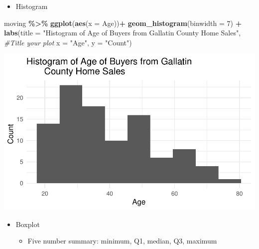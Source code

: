\documentclass[
]{report}
\newenvironment{Shaded}{\begin{snugshade}}{\end{snugshade}}
\newcommand{\AttributeTok}[1]{\textcolor[rgb]{0.13,0.29,0.53}{#1}}
\newcommand{\CommentTok}[1]{\textcolor[rgb]{0.56,0.35,0.01}{\textit{#1}}}
\newcommand{\DecValTok}[1]{\textcolor[rgb]{0.00,0.00,0.81}{#1}}
\newcommand{\FunctionTok}[1]{\textcolor[rgb]{0.13,0.29,0.53}{\textbf{#1}}}
\newcommand{\NormalTok}[1]{#1}
\newcommand{\SpecialCharTok}[1]{\textcolor[rgb]{0.81,0.36,0.00}{\textbf{#1}}}
\newcommand{\StringTok}[1]{\textcolor[rgb]{0.31,0.60,0.02}{#1}}
\providecommand{\tightlist}{%
  \setlength{\itemsep}{0pt}\setlength{\parskip}{0pt}}
\begin{document}
\newpage

\begin{itemize}
\tightlist
\item
  Histogram
\end{itemize}

\vspace{0.2in}

\begin{Shaded}
\begin{Highlighting}[]
\NormalTok{moving }\SpecialCharTok{\%\textgreater{}\%}
  \FunctionTok{ggplot}\NormalTok{(}\FunctionTok{aes}\NormalTok{(}\AttributeTok{x =}\NormalTok{ Age))}\SpecialCharTok{+}
  \FunctionTok{geom\_histogram}\NormalTok{(}\AttributeTok{binwidth =} \DecValTok{7}\NormalTok{) }\SpecialCharTok{+} 
  \FunctionTok{labs}\NormalTok{(}\AttributeTok{title =} \StringTok{"Histogram of Age of Buyers from Gallatin }
\StringTok{       County Home Sales"}\NormalTok{,}
       \CommentTok{\#Title your plot}
       \AttributeTok{x =} \StringTok{"Age"}\NormalTok{,}
       \AttributeTok{y =} \StringTok{"Count"}\NormalTok{)}
\end{Highlighting}
\end{Shaded}

\begin{center}\includegraphics[width=0.7\linewidth]{03-LN03-EDA_files/figure-latex/unnamed-chunk-16-1} \end{center}

\newpage

\begin{itemize}
\item
  Boxplot

  \begin{itemize}
  \tightlist
  \item
    Five number summary: minimum, Q1, median, Q3, maximum
  \end{itemize}
\end{itemize}

\vspace{0.3in}
\end{document}

